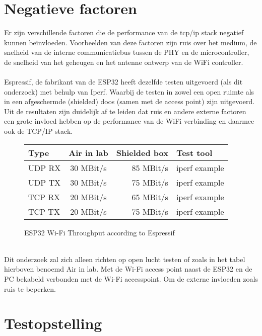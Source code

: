 \documentclass[../DCM2_Verslag.tex]{subfiles}
\begin{document}
\section{Negatieve factoren}
Er zijn verschillende factoren die de performance van de tcp/ip stack negatief kunnen beïnvloeden. Voorbeelden van deze factoren zijn ruis over het medium, de snelheid van de interne communicatiebus tussen de PHY en de microcontroller, de snelheid van het geheugen en het antenne ontwerp van de WiFi controller.\\\\
Espressif, de fabrikant van de ESP32 heeft dezelfde testen uitgevoerd (als dit onderzoek) met behulp van Iperf. Waarbij de testen in zowel een open ruimte als in een afgeschermde (shielded) doos (samen met de access point) zijn uitgevoerd. Uit de resultaten zijn duidelijk af te leiden dat ruis en andere externe factoren een grote invloed hebben op de performance van de WiFi verbinding en daarmee ook de TCP/IP stack.\\
\begin{figure}[h]
\begin{tabular}{||l|c|r|p{6cm}||}
	 \hline
 	 Type & Air in lab & Shielded box & Test tool \\
  	 \hline \hline    
   	 UDP RX & 30 MBit/s & 85 MBit/s & iperf example \\
   	 UDP TX & 30 MBit/s & 75 MBit/s & iperf example \\
   	 TCP RX & 20 MBit/s & 65 MBit/s & iperf example \\
   	 TCP TX & 20 MBit/s & 75 MBit/s & iperf example \\
\end{tabular}
\caption{ESP32 Wi-Fi Throughput according to Espressif}
\end{figure}
\\Dit onderzoek zal zich alleen richten op open lucht testen of zoals in het tabel hierboven benoemd Air in lab. Met de Wi-Fi access point naast de ESP32 en de PC bekabeld verbonden met de Wi-Fi accesspoint. Om de externe invloeden zoals ruis te beperken.
\section{Testopstelling}
\end{document}
